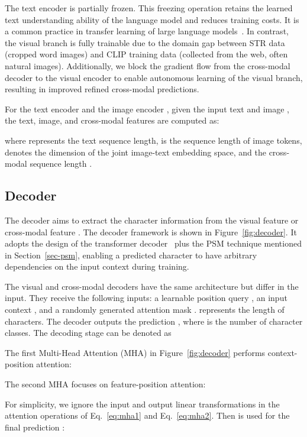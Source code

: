 \documentclass[lettersize,journal]{IEEEtran}
\begin{document}
The text encoder is partially frozen.
This freezing operation retains the learned text understanding ability of the language model and reduces training costs.
It is a common practice in transfer learning of large language models~\cite{2022_alayrac_flamingo}.
In contrast, the visual branch is fully trainable due to the domain gap between STR data (cropped word images) and CLIP training data (collected from the web, often natural images). 
Additionally, we block the gradient flow from the cross-modal decoder to the visual encoder to enable autonomous learning of the visual branch, resulting in improved refined cross-modal predictions.

For the text encoder  and the image encoder , given the input text  and image , the text,
image, and cross-modal features are computed as:

where  represents the text
sequence length,  is the 
sequence length of image tokens,
 denotes the dimension of the joint image-text embedding space,
and the cross-modal sequence length .



\subsection{Decoder} \label{sec:dec}
The decoder aims to extract the character information
from the visual feature
 or cross-modal feature .
The decoder framework is shown in Figure~\ref{fig:decoder}.
It adopts the design of the transformer
decoder~\cite{2017_attention} plus the PSM technique mentioned in Section~\ref{sec-psm},
enabling a predicted character to have arbitrary dependencies on the input context during training.


The visual and cross-modal decoders have the same architecture but differ in the input.
They receive the following inputs: a learnable position query
,
an input context ,
and a randomly generated attention mask
.
 represents the length of characters.
The decoder outputs the prediction
, where  is the number of character classes.
The decoding stage can be denoted as

The first Multi-Head Attention (MHA) in Figure~\ref{fig:decoder} performs context-position attention:

The second MHA focuses on feature-position attention:

For simplicity, we ignore the input and output linear transformations in the attention operations of Eq.~\eqref{eq:mha1}
and Eq.~\eqref{eq:mha2}.
Then  is used for the final prediction :
\end{document}
